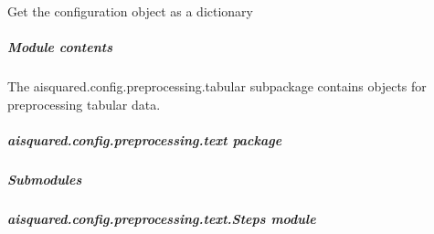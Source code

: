 \documentclass[letterpaper,10pt,english]{sphinxmanual}
\begin{document}
\begin{fulllineitems}
\begin{fulllineitems}
\end{fulllineitems}


\begin{fulllineitems}
\label{\detokenize{aisquared.config.preprocessing.tabular:aisquared.config.preprocessing.tabular.TabularPreprocessing.TabularPreprocesser.to_dict}}
\pysigstartsignatures
{}
\pysigstopsignatures
\sphinxAtStartPar
Get the configuration object as a dictionary

\end{fulllineitems}


\end{fulllineitems}



\subparagraph{Module contents}
\label{\detokenize{aisquared.config.preprocessing.tabular:module-aisquared.config.preprocessing.tabular}}\label{\detokenize{aisquared.config.preprocessing.tabular:module-contents}}
\sphinxAtStartPar
The aisquared.config.preprocessing.tabular subpackage contains objects for preprocessing tabular data.

\sphinxstepscope


\subparagraph{aisquared.config.preprocessing.text package}
\label{\detokenize{aisquared.config.preprocessing.text:aisquared-config-preprocessing-text-package}}\label{\detokenize{aisquared.config.preprocessing.text::doc}}

\subparagraph{Submodules}
\label{\detokenize{aisquared.config.preprocessing.text:submodules}}

\subparagraph{aisquared.config.preprocessing.text.Steps module}
\label{\detokenize{aisquared.config.preprocessing.text:module-aisquared.config.preprocessing.text.Steps}}\label{\detokenize{aisquared.config.preprocessing.text:aisquared-config-preprocessing-text-steps-module}}
\end{document}

